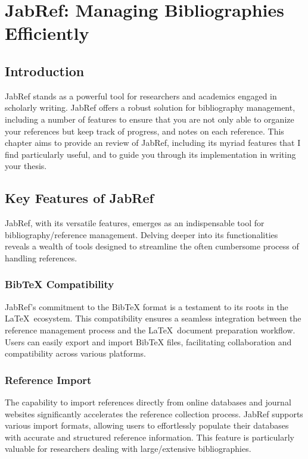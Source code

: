 \chapter{JabRef: Managing Bibliographies Efficiently}\label{ch:jabref}
	\section{Introduction}\label{sec:JRIntroduction}
		JabRef stands as a powerful tool for researchers and academics engaged in scholarly writing.
		JabRef offers a robust solution for bibliography management, including a number of features to ensure that you are not only able to organize your references but keep track of progress, and notes on each reference.
		This chapter aims to provide an review of JabRef, including its myriad features that I find particularly useful, and to guide you through its implementation in writing your thesis.

	\section{Key Features of JabRef}
		JabRef, with its versatile features, emerges as an indispensable tool for bibliography/reference management. 
		Delving deeper into its functionalities reveals a wealth of tools designed to streamline the often cumbersome process of handling references. 

		\subsection{BibTeX Compatibility}
			JabRef's commitment to the BibTeX format is a testament to its roots in the \LaTeX\ ecosystem. 
			This compatibility ensures a seamless integration between the reference management process and the \LaTeX\ document preparation workflow. 
			Users can easily export and import BibTeX files, facilitating collaboration and compatibility across various platforms.

		\subsection{Reference Import}
			The capability to import references directly from online databases and journal websites significantly accelerates the reference collection process. 
			JabRef supports various import formats, allowing users to effortlessly populate their databases with accurate and structured reference information. 
			This feature is particularly valuable for researchers dealing with large/extensive bibliographies.

